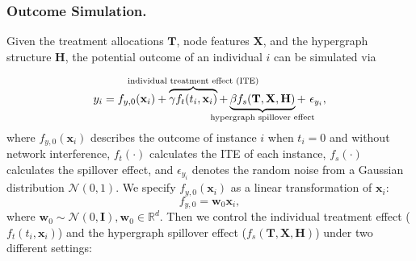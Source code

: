 \subsubsection{Outcome Simulation.} Given the treatment allocations $\mathbf{T}$, node features $\mathbf{X}$, and the hypergraph structure $\mathbf{H}$, the potential outcome of an individual $i$ can be simulated via

\begin{equation}
    y_i = f_{y,0}(\mathbf{x}_i) + \overbrace{\gamma f_t(t_i, \mathbf{x}_i)}^{\mathclap{\text{individual treatment effect (ITE)}}} + \underbrace{\beta f_s(\mathbf{T}, \mathbf{X}, \mathbf{H})}_{\mathclap{\text{hypergraph spillover effect}}} +~\epsilon_{y_i},
\end{equation}
where $f_{y,0}(\mathbf{x}_i)$ describes the outcome of instance $i$ when $t_i=0$ and without network interference, $f_t(\cdot)$ calculates the ITE of each instance,  $f_s(\cdot)$ calculates the spillover effect, and $\epsilon_{y_i}$ denotes the random noise from a Gaussian distribution $\mathcal{N}(0,1)$. 
We specify $f_{y,0}(\mathbf{x}_i)$ as a linear transformation of $\mathbf{x}_i$:
\begin{equation}
    f_{y,0}=\mathbf{w}_0\mathbf{x}_i,
\end{equation}
where $\mathbf{w}_0\sim \mathcal{N}(0,\mathbf{I}), \mathbf{w}_0\in \mathbb{R}^d$. Then we control the individual treatment effect ($f_t(t_i, \mathbf{x}_i)$) and the hypergraph spillover effect ($f_s(\mathbf{T}, \mathbf{X}, \mathbf{H})$) under two different settings:
%
